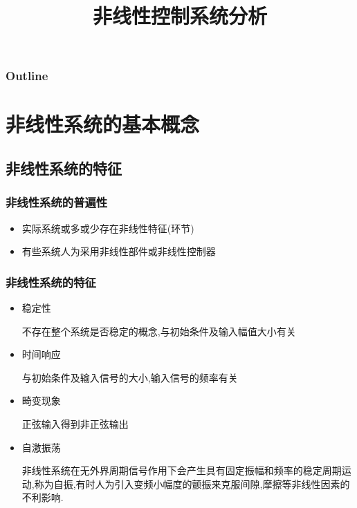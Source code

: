\documentclass[table]{beamer}
\subtitle{}
\title{非线性控制系统分析}
\author{}
\date{}
\begin{document}
\maketitle

\begin{frame}
\frametitle{Outline}
\setcounter{tocdepth}{3}
\tableofcontents
\end{frame}












\section{非线性系统的基本概念}
\label{sec-1}
\subsection{非线性系统的特征}
\label{sec-1-1}
\begin{frame}
\frametitle{非线性系统的普遍性}
\label{sec-1-1-1}

\begin{itemize}
\item 实际系统或多或少存在非线性特征(环节)
\item <2->有些系统人为采用非线性部件或非线性控制器
\end{itemize}
\end{frame}
\begin{frame}
\frametitle{非线性系统的特征}
\label{sec-1-1-2}

\begin{itemize}
\item <2->稳定性

    不存在整个系统是否稳定的概念,与初始条件及输入幅值大小有关
\item <3->时间响应

    与初始条件及输入信号的大小,输入信号的频率有关
\item <4->畸变现象

    正弦输入得到非正弦输出
\item <5->自激振荡

    非线性系统在无外界周期信号作用下会产生具有固定振幅和频率的稳定周期运动,称为自振,有时人为引入变频小幅度的颤振来克服间隙,摩擦等非线性因素的不利影响.
\end{itemize}
\end{frame}
\end{document}
